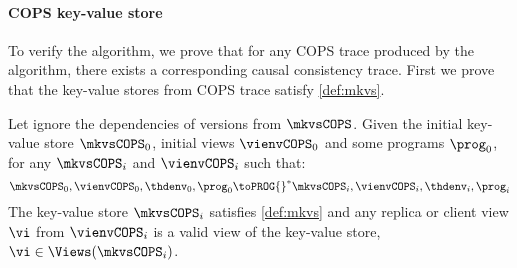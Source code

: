 \paragraph{\bf COPS key-value store}
To verify the algorithm, we prove that for any COPS trace produced by the algorithm,
there exists a corresponding causal consistency trace.
First we prove that the key-value stores from COPS trace satisfy \cref{def:mkvs}.

\begin{theorem}
    \label{thm:cops-key-value-well-form}
    Let ignore the dependencies of versions from \( \mkvsCOPS \).
    Given the initial key-value store \( \mkvsCOPS_0 \), initial views \( \vienvCOPS_0 \) and some programs \( \prog_0 \), for any \( \mkvsCOPS_i \) and \( \vienvCOPS_i \)  such that: 
    \[
        \mkvsCOPS_0, \vienvCOPS_0, \thdenv_0, \prog_0 {\toPROG{}}^* \mkvsCOPS_i, \vienvCOPS_i, \thdenv_i, \prog_i
    \]
    The key-value store \( \mkvsCOPS_i \) satisfies \cref{def:mkvs} and any replica or client view \( \vi \) from \( \vienvCOPS_i \) is a valid view of the key-value store, \ie \( \vi \in \Views(\mkvsCOPS_i) \).
\end{theorem}
